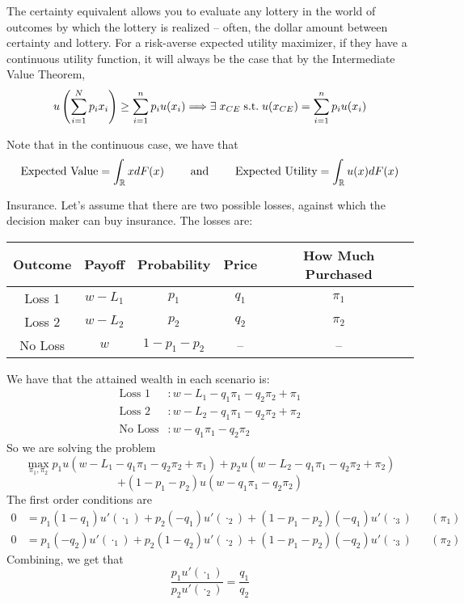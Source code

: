 \documentclass[12pt]{article}
\begin{document}
The certainty equivalent allows you to evaluate any lottery in the world of outcomes by which the lottery is realized -- often, the dollar amount between certainty and lottery. For a risk-averse expected utility maximizer, if they have a continuous utility function, it will always be the case that by the Intermediate Value Theorem,
\[
u\parl \sum_{i=1}^N p_ix_i\parr \ge \sum_{i=1}^n p_i u(x_i) \Longrightarrow \exists x_{CE} \st u(x_{CE}) = \sum_{i=1}^n p_i u(x_i)
\]

\begin{remark}
	Note that in the continuous case, we have that 
	\[
	\text{Expected Value} = \int_{\mathbb{R}} x dF(x) \qquad \text{ and } \qquad\text{Expected Utility} = \int_{\mathbb{R}} u(x) dF(x)
	\]
\end{remark}

\begin{example}
	Insurance. Let's assume that there are two possible losses, against which the decision maker can buy insurance. The losses are:
	
	\begin{table}[H]
		\centering
		\begin{tabular}{|c|c|c|c|c|}
			\hline 
			Outcome & Payoff & Probability & Price & How Much Purchased \\
			\hline 
			Loss 1 & $w - L_1$ & $p_1$ & $q_1$ & $\pi_1$ \\
			\hline 
			Loss 2 & $w - L_2$ & $p_2$ & $q_2$ & $\pi_2$ \\
			\hline
			No Loss & $w$ & $1 - p_1 - p_2$ & -- & -- \\
			\hline
		\end{tabular}
	\end{table}
	We have that the attained wealth in each scenario is:
	\begin{align*}
		\text{Loss 1} &: w - L_1 - q_1\pi_1 - q_2\pi_2 + \pi_1 \\
		\text{Loss 2} &: w - L_2 - q_1\pi_1 - q_2\pi_2 + \pi_2 \\
		\text{No Loss} &: w - q_1\pi_1 - q_2\pi_2 
	\end{align*}
	So we are solving the problem
	\[
	\max_{\pi_1,\pi_2} p_1 u(w - L_1 - q_1\pi_1 - q_2\pi_2 + \pi_1) + p_2 u( w - L_2 - q_1\pi_1 - q_2\pi_2 + \pi_2)
	\]
	\[
	+ (1-p_1-p_2) u(w - q_1\pi_1 - q_2\pi_2 )
	\]
	The first order conditions are
	\begin{align*}
		0 &= p_1(1-q_1) u'(\cdot_1) + p_2(-q_1) u'(\cdot_2) + (1-p_1-p_2)(-q_1) u'(\cdot_3) &&(\pi_1) \\
		0 &= p_1(-q_2) u'(\cdot_1) + p_2(1-q_2)u'(\cdot_2) + (1-p_1-p_2)(-q_2) u'(\cdot_3) &&(\pi_2)
	\end{align*}
	Combining, we get that
	\[
	\frac{p_1 u'(\cdot_1)}{p_2 u'(\cdot_2)} = \frac{q_1}{q_2}
	\]
\end{example}
\end{document}
